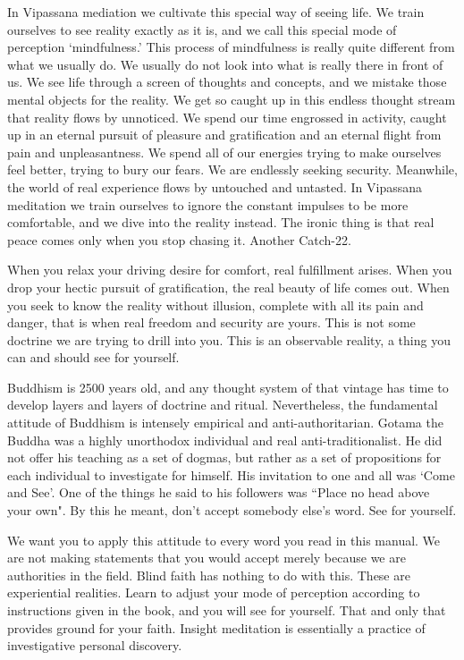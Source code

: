 In Vipassana mediation we cultivate this special way of seeing life. We train
ourselves to see reality exactly as it is, and we call this special mode of
perception `mindfulness.' This process of mindfulness is really quite different
from what we usually do. We usually do not look into what is really there in
front of us. We see life through a screen of thoughts and concepts, and we
mistake those mental objects for the reality. We get so caught up in this
endless thought stream that reality flows by unnoticed. We spend our time
engrossed in activity, caught up in an eternal pursuit of pleasure and
gratification and an eternal flight from pain and unpleasantness. We spend all
of our energies trying to make ourselves feel better, trying to bury our fears.
We are endlessly seeking security. Meanwhile, the world of real experience flows
by untouched and untasted. In Vipassana meditation we train ourselves to ignore
the constant impulses to be more comfortable, and we dive into the reality
instead. The ironic thing is that real peace comes only when you stop chasing
it. Another Catch-22.

When you relax your driving desire for comfort, real fulfillment arises. When
you drop your hectic pursuit of gratification, the real beauty of life comes
out. When you seek to know the reality without illusion, complete with all its
pain and danger, that is when real freedom and security are yours. This is not
some doctrine we are trying to drill into you. This is an observable reality, a
thing you can and should see for yourself.

Buddhism is 2500 years old, and any thought system of that vintage has time to
develop layers and layers of doctrine and ritual.  Nevertheless, the fundamental
attitude of Buddhism is intensely empirical and anti-authoritarian. Gotama the
Buddha was a highly unorthodox individual and real anti-traditionalist. He did
not offer his teaching as a set of dogmas, but rather as a set of propositions
for each individual to investigate for himself. His invitation to one and all
was `Come and See'. One of the things he said to his followers was ``Place no
head above your own". By this he meant, don't accept somebody else's word. See
for yourself.

We want you to apply this attitude to every word you read in this manual. We are
not making statements that you would accept merely because we are authorities in
the field. Blind faith has nothing to do with this. These are experiential
realities. Learn to adjust your mode of perception according to instructions
given in the book, and you will see for yourself. That and only that provides
ground for your faith. Insight meditation is essentially a practice of
investigative personal discovery.

